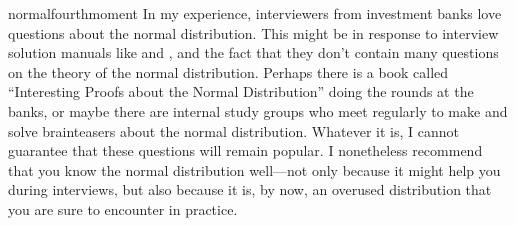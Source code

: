 \begin{answer}{normalfourthmoment}
In my experience, interviewers from investment banks love questions about the normal distribution.
This might be in response to interview solution manuals like
\citet{HeardOnTheStreet} and \citet{JoshiQA},
and the fact that they don't contain many questions on the theory of the normal distribution.
Perhaps there is a book called ``Interesting Proofs about the Normal Distribution'' doing the rounds at the banks, or maybe there are internal study groups who meet regularly to make and solve brainteasers about the normal distribution.
Whatever it is, I cannot guarantee that these questions will remain popular.
I nonetheless recommend that you know the normal distribution well---not only because it might help you during interviews, but also because it is, by now, an overused distribution that you are sure to encounter in practice.
\end{answer}
